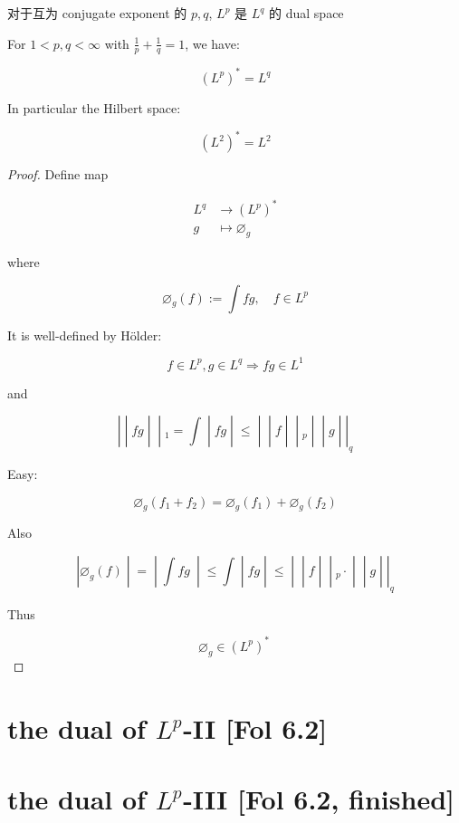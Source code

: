 \documentclass{qlnotes-export}
\begin{document}
\begin{theorem}{对于互为 conjugate exponent 的 \(p,q\), \(L^{p}\) 是 \(L^{q}\) 的 dual
space}\label{thm-13-the-dual-of-l-p-spaces-conjugate-exponent-p-q-l-p-l-q-dual-space}

For \(1 < p,q < \infty\) with \(\frac{1}{p} + \frac{1}{q} = 1\), we have:

\[(L^{p})^{\ast} = L^{q}\]

In particular the Hilbert space:

\[(L^{2})^{\ast} = L^{2}\]

\end{theorem}

\begin{proof}

Define map

\[\begin{matrix}
L^{q} & {\rightarrow(L^{p})^{\ast}} \\
g & {\mapsto\varnothing_{g}}
\end{matrix}\]

where

\[\varnothing_{g}(f) := \int fg,\quad f \in L^{p}\]

It is well-defined by Hölder:

\[f \in L^{p},g \in L^{q}\Longrightarrow fg \in L^{1}\]

and

\[\left. | \middle| fg \middle| \middle| {}_{1} = \int \middle| fg \middle| \leq \middle| \middle| f \middle| \middle| {}_{p} \middle| \middle| g \middle| |_{q} \right.\]

Easy:

\[\varnothing_{g}(f_{1} + f_{2}) = \varnothing_{g}(f_{1}) + \varnothing_{g}(f_{2})\]

Also

\[\left. |\varnothing_{g}(f) \middle| = \middle| \int fg\  \middle| \leq \int \middle| fg \middle| \leq \middle| \middle| f \middle| \middle| {}_{p} \cdot \middle| \middle| g \middle| |_{q} \right.\]

Thus

\[\varnothing_{g} \in (L^{p})^{\ast}\ \]

\end{proof}

\section{\texorpdfstring{the dual of \(L^{p}\)-II {[}Fol 6.2{]}}{the dual of L\^{}\{p\}-II {[}Fol 6.2{]}}}

\section{\texorpdfstring{the dual of \(L^{p}\)-III {[}Fol 6.2, finished{]}}{the dual of L\^{}\{p\}-III {[}Fol 6.2, finished{]}}}

\printbibliography
\end{document}
